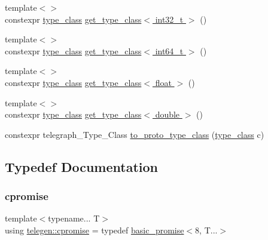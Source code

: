 \begin{DoxyCompactItemize}
\item 
{\footnotesize template$<$$>$ }\\constexpr \hyperlink{namespacetelegen_a72d4e69f0be1731e1a851a96dec858d8}{type\+\_\+class} \hyperlink{namespacetelegen_a446ea223e47eca730cb98b51f0c67a01}{get\+\_\+type\+\_\+class$<$ int32\+\_\+t $>$} ()
\item 
{\footnotesize template$<$$>$ }\\constexpr \hyperlink{namespacetelegen_a72d4e69f0be1731e1a851a96dec858d8}{type\+\_\+class} \hyperlink{namespacetelegen_aa2d79b86d034fbe0fb62169f96652ec6}{get\+\_\+type\+\_\+class$<$ int64\+\_\+t $>$} ()
\item 
{\footnotesize template$<$$>$ }\\constexpr \hyperlink{namespacetelegen_a72d4e69f0be1731e1a851a96dec858d8}{type\+\_\+class} \hyperlink{namespacetelegen_a5268b4aae390befad50bb87802cc0b64}{get\+\_\+type\+\_\+class$<$ float $>$} ()
\item 
{\footnotesize template$<$$>$ }\\constexpr \hyperlink{namespacetelegen_a72d4e69f0be1731e1a851a96dec858d8}{type\+\_\+class} \hyperlink{namespacetelegen_a22e19e6aeb49b070760d26eb1f4e996a}{get\+\_\+type\+\_\+class$<$ double $>$} ()
\item 
constexpr telegraph\+\_\+\+Type\+\_\+\+Class \hyperlink{namespacetelegen_a481dd47fb09859854721a748892d2a02}{to\+\_\+proto\+\_\+type\+\_\+class} (\hyperlink{namespacetelegen_a72d4e69f0be1731e1a851a96dec858d8}{type\+\_\+class} c)
\end{DoxyCompactItemize}


\subsection{Typedef Documentation}
\mbox{\label{namespacetelegen_a73ca2c44e7e302c2405f99a28e35acb7}} 
\subsubsection{\texorpdfstring{cpromise}{cpromise}}
{\footnotesize\ttfamily template$<$typename... T$>$ \\
using \hyperlink{namespacetelegen_a73ca2c44e7e302c2405f99a28e35acb7}{telegen\+::cpromise} = typedef \hyperlink{classtelegen_1_1basic__promise}{basic\+\_\+promise}$<$8, T...$>$}

